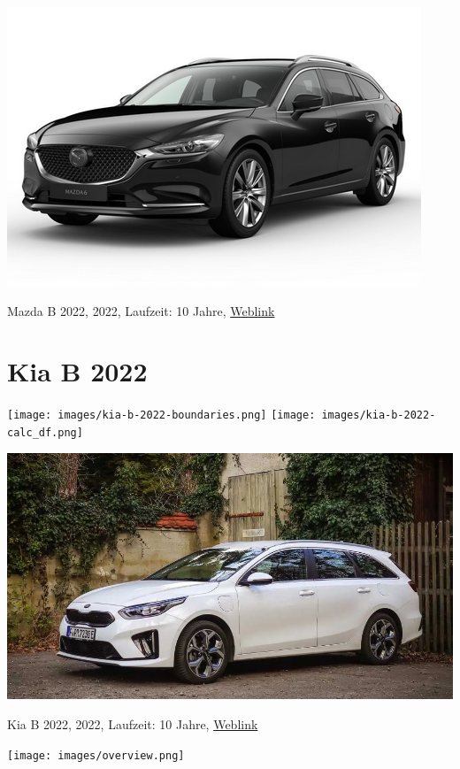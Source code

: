 \documentclass[landscape, DIV=99, 14pt]{scrartcl}
\begin{document}
\pagebreak
\null
\vspace{2cm}
\begin{center}
\includegraphics[width=0.9\columnwidth]{cars/mazda-6-neu.png}

Mazda B 2022, 2022, Laufzeit: 10 Jahre, \href{https://konfigurator.meinauto.de/mazda/neuwagen/48-6/angebote/6-kombi/konfigurator/\#!/extras/exclusive-line/8846370/10,11/private/65352-5416-204698/984/61c9aa657e74c/cash-purchase/32545--287374/48,0,10000,0,0,0,0,0,}{Weblink}
\end{center}

\pagebreak


\twocolumn

\section*{Kia B 2022}
\begin{center}
\texttt{[image: images/kia-b-2022-boundaries.png]}
\null
\vspace{0.5cm}
\texttt{[image: images/kia-b-2022-calc\_df.png]}
\end{center}

\pagebreak
\null
\vspace{2cm}
\begin{center}
\includegraphics[width=0.9\columnwidth]{cars/kia-ceed-sportswagon.png}

Kia B 2022, 2022, Laufzeit: 10 Jahre, \href{https://konfigurator.meinauto.de/kia/neuwagen/cee-d/angebote/cee-d-sporty-wagon/konfigurator/\#!/preisvergleich/platinum/8867329/3,7,18/private/109347-4167-291321/1321/61d21ce73c5db/cash-purchase/109348-8088-291322/48,0,10000,0,0,0,0,0,}{Weblink}
\end{center}

\pagebreak



\pagebreak

\onecolumn
\null
\vfill 
\begin{center}
\texttt{[image: images/overview.png]}
\end{center}
\vfill 
\end{document}
